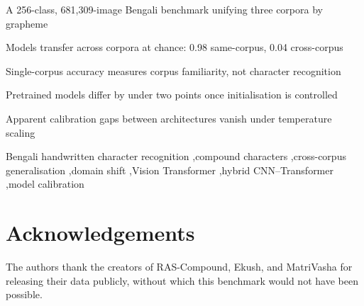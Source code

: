 \documentclass[5p,10pt]{elsarticle}
\begin{document}
\begin{frontmatter}
\begin{highlights}
\item A 256-class, 681,309-image Bengali benchmark unifying three corpora by grapheme
\item Models transfer across corpora at chance: 0.98 same-corpus, 0.04 cross-corpus
\item Single-corpus accuracy measures corpus familiarity, not character recognition
\item Pretrained models differ by under two points once initialisation is controlled
\item Apparent calibration gaps between architectures vanish under temperature scaling
\end{highlights}

\begin{keyword}
Bengali handwritten character recognition \sep compound characters \sep cross-corpus generalisation \sep domain shift \sep Vision Transformer \sep hybrid CNN--Transformer \sep model calibration
\end{keyword}

\end{frontmatter}



\section*{Acknowledgements}
The authors thank the creators of RAS-Compound, Ekush, and MatriVasha for releasing their data publicly, without which this benchmark would not have been possible.



\end{document}
